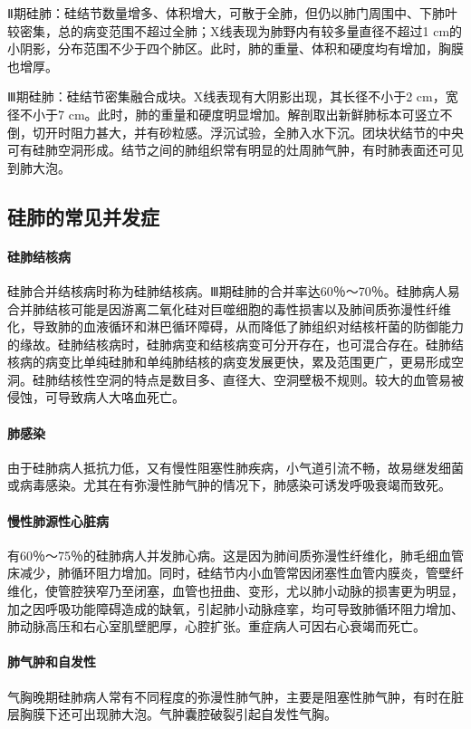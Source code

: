 Ⅱ期硅肺：硅结节数量增多、体积增大，可散于全肺，但仍以肺门周围中、下肺叶较密集，总的病变范围不超过全肺；X线表现为肺野内有较多量直径不超过1
cm的小阴影，分布范围不少于四个肺区。此时，肺的重量、体积和硬度均有增加，胸膜也增厚。

Ⅲ期硅肺：硅结节密集融合成块。X线表现有大阴影出现，其长径不小于2
cm，宽径不小于7
cm。此时，肺的重量和硬度明显增加。解剖取出新鲜肺标本可竖立不倒，切开时阻力甚大，并有砂粒感。浮沉试验，全肺入水下沉。团块状结节的中央可有硅肺空洞形成。结节之间的肺组织常有明显的灶周肺气肿，有时肺表面还可见到肺大泡。

\subsection{硅肺的常见并发症}

\paragraph{硅肺结核病}
硅肺合并结核病时称为硅肺结核病。Ⅲ期硅肺的合并率达60％～70％。硅肺病人易合并肺结核可能是因游离二氧化硅对巨噬细胞的毒性损害以及肺间质弥漫性纤维化，导致肺的血液循环和淋巴循环障碍，从而降低了肺组织对结核杆菌的防御能力的缘故。硅肺结核病时，硅肺病变和结核病变可分开存在，也可混合存在。硅肺结核病的病变比单纯硅肺和单纯肺结核的病变发展更快，累及范围更广，更易形成空洞。硅肺结核性空洞的特点是数目多、直径大、空洞壁极不规则。较大的血管易被侵蚀，可导致病人大咯血死亡。

\paragraph{肺感染}
由于硅肺病人抵抗力低，又有慢性阻塞性肺疾病，小气道引流不畅，故易继发细菌或病毒感染。尤其在有弥漫性肺气肿的情况下，肺感染可诱发呼吸衰竭而致死。

\paragraph{慢性肺源性心脏病}
有60％～75％的硅肺病人并发肺心病。这是因为肺间质弥漫性纤维化，肺毛细血管床减少，肺循环阻力增加。同时，硅结节内小血管常因闭塞性血管内膜炎，管壁纤维化，使管腔狭窄乃至闭塞，血管也扭曲、变形，尤以肺小动脉的损害更为明显，加之因呼吸功能障碍造成的缺氧，引起肺小动脉痉挛，均可导致肺循环阻力增加、肺动脉高压和右心室肌壁肥厚，心腔扩张。重症病人可因右心衰竭而死亡。

\paragraph{肺气肿和自发性}
气胸晚期硅肺病人常有不同程度的弥漫性肺气肿，主要是阻塞性肺气肿，有时在脏层胸膜下还可出现肺大泡。气肿囊腔破裂引起自发性气胸。

